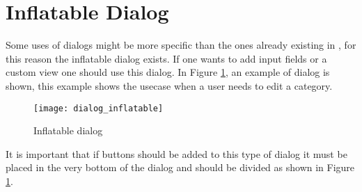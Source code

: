 \section{Inflatable Dialog}
\label{sec:inflatable_dialog}

Some uses of dialogs might be more specific than the ones already existing in \gc, for this reason the inflatable dialog exists. If one wants to add input fields or a custom view one should use this dialog. In Figure \ref{fig:inflatable_dialog}, an example of dialog is shown, this example shows the usecase when a user needs to edit a category.

\begin{figure}[h]
	\centering
	\texttt{[image: dialog\_inflatable]}
	\caption{Inflatable dialog}
	\label{fig:inflatable_dialog}
\end{figure}
\FloatBarrier

\begin{note}
	It is important that if buttons should be added to this type of dialog it must be placed in the very bottom of the dialog and should be divided as shown in Figure \ref{fig:inflatable_dialog}.
\end{note}





